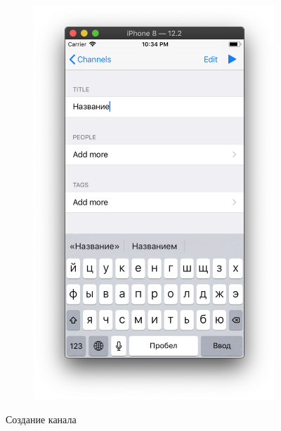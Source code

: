 \documentclass[a4paper,12pt]{article}
\begin{document}
\begin{figure}[h!]
\begin{subfigure}[b]{0.3\linewidth}
			\includegraphics[width=\linewidth]{../includes/pmi/edit_title.png}
		\end{subfigure}
		\caption{Создание канала}
	\end{figure}
	\clearpage
\end{document}
